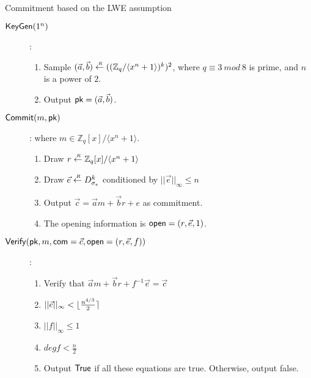 \begin{section}{Commitment based on the LWE assumption~\cite{DBLP:conf/esorics/BenhamoudaKLP15}}

\begin{description}
\item[$\boldmath{{\mathsf{KeyGen}}}(1^n)$]:
  \begin{enumerate}
  \item Sample $(\vec{a}, \vec{b}) \stackrel{{\scriptscriptstyle \mkern4mu R}}{\gets} ((\mathbb{Z}_q/\langle x^n + 1\rangle)^k)^2$, where $q \equiv 3~mod~8$ is prime, and $n$ is a power of $2$.
  \item Output $ \mathsf{pk} = (\vec{a}, \vec{b})$.
  \end{enumerate}

\item[$\boldmath{{\mathsf{Commit}}}(m, \mathsf{pk})$]: where $m \in \mathbb{Z}_q[x]/\langle x^n + 1 \rangle$.
  \begin{enumerate}
  \item Draw $r \stackrel{{\scriptscriptstyle \mkern4mu R}}{\gets} \mathbb{Z}_q[x]/\langle x^n +1 \rangle$ 
  \item Draw $\vec{e} \stackrel{{\scriptscriptstyle \mkern4mu R}}{\gets} D_{\sigma_e}^k$ conditioned by $||\vec{e}||_{\infty} \leq n$
  \item Output $\vec{c} = \vec{a}m + \vec{b}r + e$ as commitment.
  \item The opening information is $\mathsf{open} = (r, \vec{e},1)$.
  \end{enumerate}

\item[$\boldmath{{\mathsf{Verify}}}(\mathsf{pk}, m, \mathsf{com} = \vec{c}, \mathsf{open} = (r, \vec{e}, f))$]:
  \begin{enumerate}
  \item Verify that $\vec{a} m + \vec{b} r + f^{-1}\vec{e} = \vec{c}$
  \item $||\vec{e}||_{\infty} < \lfloor\frac{n^{4/3}}{2}\rceil$
  \item $||f||_{\infty} \leq 1$
  \item $deg f < \frac{n}{2}$
  \item Output $\mathsf{True}$ if all these equations are true. Otherwise, output false.
  \end{enumerate}
\end{description}

\end{section}

